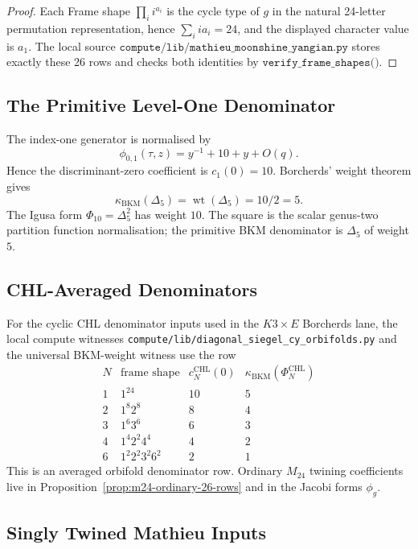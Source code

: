 \documentclass[11pt]{article}
\providecommand{\kBKM}{\kappa_{\mathrm{BKM}}}
\providecommand{\wt}{\operatorname{wt}}
\providecommand{\Delf}{\Delta_5}
\providecommand{\PhiTen}{\Phi_{10}}
\begin{document}
\begin{proof}
Each Frame shape \(\prod_i i^{a_i}\) is the cycle type of \(g\) in the
natural 24-letter permutation representation, hence
\(\sum_i i a_i=24\), and the displayed character value is \(a_1\).
The local source
\(\texttt{compute/lib/mathieu\_moonshine\_yangian.py}\) stores exactly
these 26 rows and checks both identities by
\(\texttt{verify\_frame\_shapes()}\).
\end{proof}

\subsection{The Primitive Level-One Denominator}

The index-one generator is normalised by
\[
  \phi_{0,1}(\tau,z)=y^{-1}+10+y+O(q).
\]
Hence the discriminant-zero coefficient is \(c_1(0)=10\).  Borcherds'
weight theorem gives
\[
  \kBKM(\Delf)=\wt(\Delf)=10/2=5.
\]
The Igusa form \(\PhiTen=\Delf^2\) has weight \(10\).  The square is the
scalar genus-two partition function normalisation; the primitive BKM
denominator is \(\Delf\) of weight \(5\).

\subsection{CHL-Averaged Denominators}

For the cyclic CHL denominator inputs used in the \(K3\times E\)
Borcherds lane, the local compute witnesses
\texttt{compute/lib/diagonal\_siegel\_cy\_orbifolds.py} and
the universal BKM-weight witness use the row
\[
\begin{array}{c|c|c|c}
N & \text{frame shape} & c_N^{\mathrm{CHL}}(0) &
\kBKM(\Phi_N^{\mathrm{CHL}})\\
\hline
1 & 1^{24} & 10 & 5\\
2 & 1^{8}2^{8} & 8 & 4\\
3 & 1^{6}3^{6} & 6 & 3\\
4 & 1^{4}2^{2}4^{4} & 4 & 2\\
6 & 1^{2}2^{2}3^{2}6^{2} & 2 & 1
\end{array}
\]
This is an averaged orbifold denominator row.  Ordinary \(M_{24}\)
twining coefficients live in Proposition~\ref{prop:m24-ordinary-26-rows}
and in the Jacobi forms \(\phi_g\).

\subsection{Singly Twined Mathieu Inputs}
\end{document}
